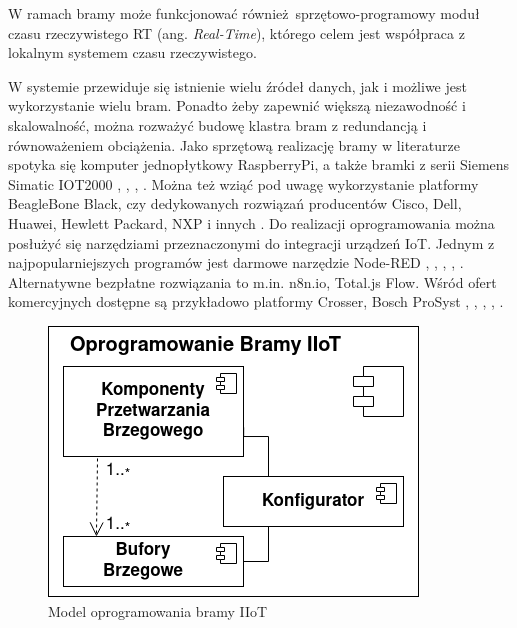 \documentclass[a4paper, 12pt, twoside]{article}
\begin{document}
W ramach bramy może funkcjonować również sprzętowo-programowy moduł
czasu rzeczywistego RT (ang. \emph{Real-Time}), którego celem jest współpraca
z lokalnym systemem czasu rzeczywistego. 

W systemie przewiduje się istnienie wielu źródeł
danych, jak i możliwe jest wykorzystanie wielu bram. Ponadto żeby zapewnić 
większą niezawodność i skalowalność,
można rozważyć budowę klastra bram z redundancją i równoważeniem obciążenia.
Jako sprzętową realizację bramy w literaturze spotyka się komputer jednopłytkowy
RaspberryPi, a także bramki z serii Siemens Simatic IOT2000
\cite{iiot-opensource-gateway}, \cite{design-impl-node-gateway},
\cite{low-cost-esp32-pi-node-red-scada}, \cite{modbus-iot-gateway}. Można też
wziąć pod uwagę wykorzystanie platformy BeagleBone Black, czy dedykowanych rozwiązań
producentów Cisco, Dell, Huawei, Hewlett Packard, NXP i innych \cite{gateways}.
Do realizacji oprogramowania można posłużyć się narzędziami przeznaczonymi do
integracji urządzeń IoT. Jednym z najpopularniejszych programów jest
darmowe narzędzie Node-RED \cite{flow-programming}, \cite{iot-gateway-medical-and-industrial},
\cite{design-impl-node-gateway}, \cite{iiot-opensource-gateway}, \cite{low-cost-esp32-pi-node-red-scada}.
Alternatywne bezpłatne rozwiązania to m.in. n8n.io, Total.js Flow.
Wśród ofert komercyjnych dostępne są przykładowo platformy Crosser, Bosch ProSyst
\cite{node-red}, \cite{n8n}, \cite{total-js-flow}, \cite{crosser}, \cite{gateways}.

\begin{figure}
      \centering
      \includegraphics[scale=0.4]{oprog_bramy.png}
      \caption{Model oprogramowania bramy IIoT}
      \label{fig:gateway_soft}
\end{figure}
\end{document}
